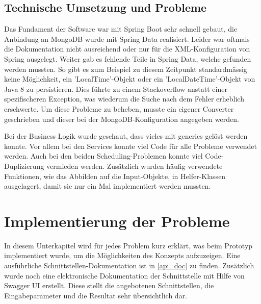 \subsection{Technische Umsetzung und Probleme}
Das Fundament der Software war mit Spring Boot \cite{spring_boot} sehr schnell gebaut, die Anbindung an MongoDB wurde mit Spring Data \cite{spring_data} realisiert. Leider war 
oftmals die Dokumentation nicht ausreichend oder nur für die XML-Konfiguration von Spring ausgelegt. Weiter gab es fehlende Teile in Spring Data, welche gefunden werden mussten. 
So gibt es zum Beispiel zu diesem Zeitpunkt standardmässig keine Möglichkeit, ein 'LocalTime'-Objekt oder ein 'LocalDateTime'-Objekt von Java 8 zu persistieren. Dies führte zu einem 
Stackoverflow anstatt einer spezifischeren Exception, was wiederum die Suche nach dem Fehler erheblich erschwerte. Um diese Probleme zu beheben, musste ein eigener Converter 
geschrieben und dieser bei der MongoDB-Konfiguration angegeben werden.

Bei der Business Logik wurde geschaut, dass vieles mit \gls{generics} gelöst werden konnte. Vor allem bei den Services konnte viel Code für alle Probleme verwendet werden. Auch 
bei den beiden Scheduling-Problemen konnte viel Code-Duplizierung vermieden werden. Zusätzlich wurden häufig verwendete Funktionen, wie das Abbilden auf die Input-Objekte, in 
Helfer-Klassen ausgelagert, damit sie nur ein Mal implementiert werden mussten.

\section{Implementierung der Probleme}\label{impl_problems}
In diesem Unterkapitel wird für jedes Problem kurz erklärt, was beim Prototyp implementiert wurde, um die Möglichkeiten des Konzepts aufzuzeigen. Eine ausführliche 
Schnittstellen-Dokumentation ist in \autoref{api_doc} zu finden. Zusätzlich wurde noch eine elektronische Dokumentation der Schnittstelle mit Hilfe von Swagger UI erstellt. Diese stellt die 
angebotenen Schnittstellen, die Eingabeparameter und die Resultat sehr übersichtlich dar.

